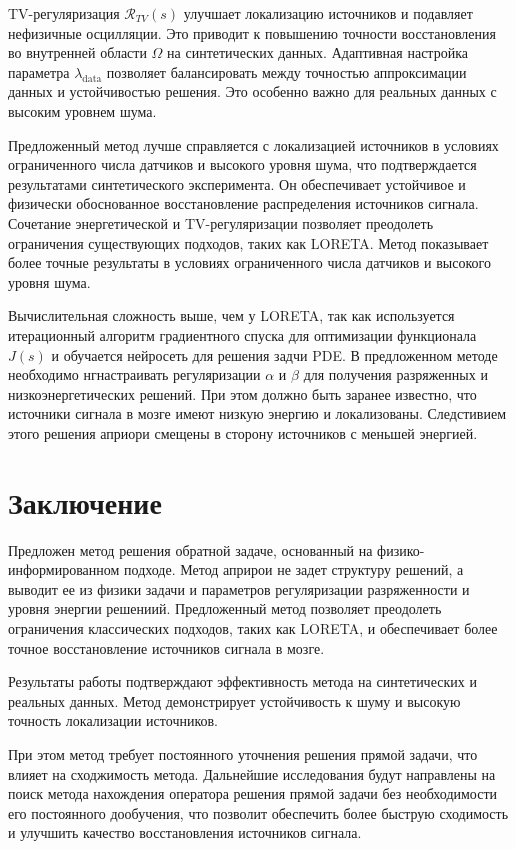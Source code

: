 \documentclass[a4paper,14pt,oneside,openany]{extarticle}
\begin{document}
TV-регуляризация $\mathcal{R}_{TV}(s)$ улучшает локализацию источников и подавляет нефизичные осцилляции. 
Это приводит к повышению точности восстановления во внутренней области $\Omega$ на синтетических данных. 
Адаптивная настройка параметра $\lambda_{\mathrm{data}}$ позволяет балансировать между точностью аппроксимации данных и устойчивостью решения. 
Это особенно важно для реальных данных с высоким уровнем шума.

Предложенный метод лучше справляется с локализацией источников в условиях ограниченного числа датчиков и высокого уровня шума, что подтверждается результатами синтетического эксперимента.
Он обеспечивает устойчивое и физически обоснованное восстановление распределения источников сигнала. 
Сочетание энергетической и TV-регуляризации позволяет преодолеть ограничения существующих подходов, таких как LORETA. 
Метод показывает более точные результаты в условиях ограниченного числа датчиков и высокого уровня шума.

Вычислительная сложность выше, чем у LORETA, так как используется итерационный алгоритм градиентного спуска для оптимизации функционала $J(s)$ и обучается нейросеть для решения задчи PDE.
В предложенном методе необходимо нгнастраивать регуляризации $\alpha$ и $\beta$ для получения разряженных и низкоэнергетических решений. При этом должно быть заранее 
известно, что источники сигнала в мозге имеют низкую энергию и локализованы. 
Следстивием этого решения априори смещены в сторону источников с меньшей энергией.

\section{Заключение}

Предложен метод решения обратной задаче, основанный на физико-информированном подходе.
Метод априрои не задет структуру решений, а выводит ее из физики задачи
и параметров регуляризации разряженности и уровня энергии решениий.
Предложенный метод позволяет преодолеть ограничения классических подходов, таких как LORETA, и обеспечивает более точное восстановление источников сигнала в мозге. 

Результаты работы подтверждают эффективность метода на синтетических и реальных данных. 
Метод демонстрирует устойчивость к шуму и высокую точность локализации источников.

При этом метод требует постоянного уточнения решения прямой задачи, что влияет на сходжимость метода. Дальнейшие исследования будут направлены на поиск метода
нахождения оператора решения прямой задачи без необходимости его постоянного дообучения, что позволит обеспечить более быструю сходимость и улучшить качество восстановления источников сигнала.


\newpage

\end{document}
